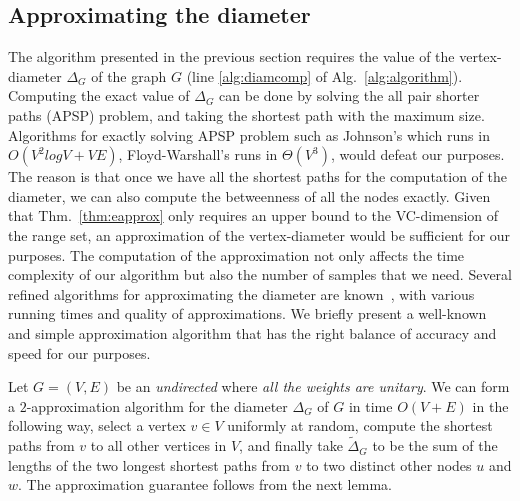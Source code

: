 \subsection{Approximating the diameter}\label{sec:diam}
The algorithm presented in the previous section requires the value of the vertex-diameter $\Delta_G$ of the graph $G$ (line
\ref{alg:diamcomp} of Alg.~\ref{alg:algorithm}). 
Computing the exact value of $\Delta_G$ can be done by solving the all pair shorter paths (APSP) problem, and taking the
shortest path with the maximum size.
Algorithms for exactly solving APSP problem such as Johnson's which runs in $O(V^2logV+VE)$, Floyd-Warshall's runs in $\Theta(V^3)$, would defeat our purposes.
The reason is that once we have all the shortest paths for the computation of the diameter, we can also compute the betweenness of all the nodes exactly. 
Given that Thm.~\ref{thm:eapprox} only requires an upper bound to the VC-dimension of the range set, an approximation of the vertex-diameter would be sufficient for our purposes.
The computation of the approximation not only affects the time complexity of our algorithm but also the number of samples that we need.
Several refined algorithms for approximating the diameter are known~\citep{AingwordCIM99,BoitmanisFL06,RodittyW12}, with various running times and quality of approximations.
 We briefly present a well-known and simple approximation algorithm that has the right balance of accuracy and speed for our purposes.


Let $G=(V,E)$ be an \emph{undirected} where \emph{all the weights are unitary}.
We can form a $2$-approximation algorithm for the diameter $\Delta_G$ of $G$ in time $O(V+E)$ in the following way, 
select a vertex $v\in V$ uniformly at random, compute the shortest paths from $v$ to all other vertices in $V$, and finally take
$\tilde\Delta_G$ to be the sum of the lengths of the two longest shortest paths
from $v$ to two distinct other nodes $u$ and $w$.
The approximation guarantee follows from the next lemma.


